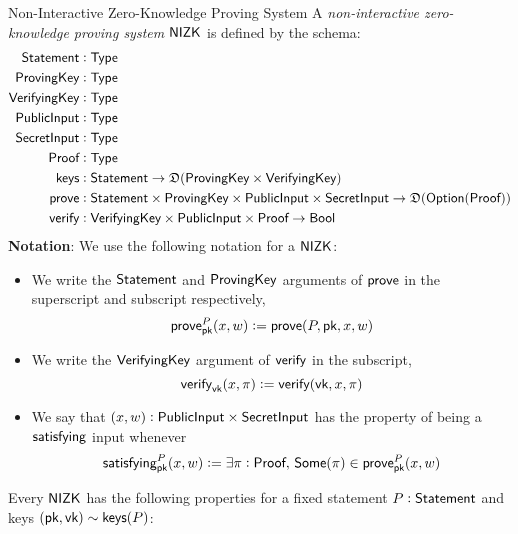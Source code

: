 \begin{definitiontoc}{Non-Interactive Zero-Knowledge Proving System}
    A \emph{non-interactive zero-knowledge proving system} ${\textsf{NIZK}}$ is defined by the schema:
    \begin{align*}
        {\textsf{Statement}}    &: {\textsf{Type}} \\
        {\textsf{ProvingKey}}   &: {\textsf{Type}} \\
        {\textsf{VerifyingKey}} &: {\textsf{Type}} \\
        {\textsf{PublicInput}}  &: {\textsf{Type}} \\
        {\textsf{SecretInput}}  &: {\textsf{Type}} \\
        {\textsf{Proof}}        &: {\textsf{Type}} \\
        {\textsf{keys}}         &: {\textsf{Statement}} \to \mathfrak{D}({\textsf{ProvingKey}} \times {\textsf{VerifyingKey}}) \\
        {\textsf{prove}}        &: {\textsf{Statement}} \times {\textsf{ProvingKey}} \times {\textsf{PublicInput}} \times {\textsf{SecretInput}} \to \mathfrak{D}({\textsf{Option}}({\textsf{Proof}})) \\
        {\textsf{verify}}       &: {\textsf{VerifyingKey}} \times {\textsf{PublicInput}} \times {\textsf{Proof}} \to {\textsf{Bool}}
    \end{align*}
    \textbf{Notation}: We use the following notation for a ${\textsf{NIZK}}$:
    \begin{itemize}
        \item We write the ${\textsf{Statement}}$ and ${\textsf{ProvingKey}}$ arguments of ${\textsf{prove}}$ in the superscript and subscript respectively,
            \[{\textsf{prove}}^P_{\textsf{pk}}(x, w) := {\textsf{prove}}(P, {\textsf{pk}}, x, w)\]
        \item We write the ${\textsf{VerifyingKey}}$ argument of ${\textsf{verify}}$ in the subscript,
            \[{\textsf{verify}}_{\textsf{vk}}(x, \pi) := {\textsf{verify}}({\textsf{vk}}, x, \pi)\]
        \item We say that $(x, w) : {\textsf{PublicInput}} \times {\textsf{SecretInput}}$ has the property of being a ${\textsf{satisfying}}$ input whenever
            \[{\textsf{satisfying}}^P_{\textsf{pk}}(x, w) := \exists \pi : {\textsf{Proof}},\, {\textsf{Some}}(\pi) \in {\textsf{prove}}^P_{\textsf{pk}}(x, w)\]
    \end{itemize}

    Every ${\textsf{NIZK}}$ has the following properties for a fixed statement $P : {\textsf{Statement}}$ and keys $({\textsf{pk}}, {\textsf{vk}}) \sim {\textsf{keys}}(P)$:


\end{definitiontoc}

